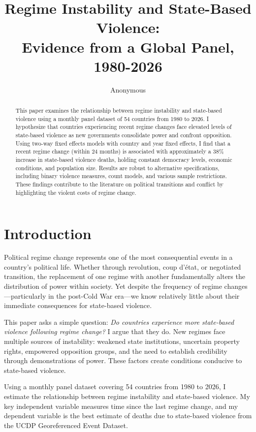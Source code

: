 \documentclass[12pt]{article}
\title{\textbf{Regime Instability and State-Based Violence:} \\ Evidence from a Global Panel, 1980-2026}
\author{Anonymous}
\date{}
\begin{document}
\maketitle

\begin{abstract}
This paper examines the relationship between regime instability and state-based violence using a monthly panel dataset of 54 countries from 1980 to 2026. I hypothesize that countries experiencing recent regime changes face elevated levels of state-based violence as new governments consolidate power and confront opposition. Using two-way fixed effects models with country and year fixed effects, I find that a recent regime change (within 24 months) is associated with approximately a 38\% increase in state-based violence deaths, holding constant democracy levels, economic conditions, and population size. Results are robust to alternative specifications, including binary violence measures, count models, and various sample restrictions. These findings contribute to the literature on political transitions and conflict by highlighting the violent costs of regime change.
\end{abstract}

\section{Introduction}

Political regime change represents one of the most consequential events in a country's political life. Whether through revolution, coup d'\'etat, or negotiated transition, the replacement of one regime with another fundamentally alters the distribution of power within society. Yet despite the frequency of regime changes---particularly in the post-Cold War era---we know relatively little about their immediate consequences for state-based violence.

This paper asks a simple question: \textit{Do countries experience more state-based violence following regime change?} I argue that they do. New regimes face multiple sources of instability: weakened state institutions, uncertain property rights, empowered opposition groups, and the need to establish credibility through demonstrations of power. These factors create conditions conducive to state-based violence.

Using a monthly panel dataset covering 54 countries from 1980 to 2026, I estimate the relationship between regime instability and state-based violence. My key independent variable measures time since the last regime change, and my dependent variable is the best estimate of deaths due to state-based violence from the UCDP Georeferenced Event Dataset.
\end{document}
